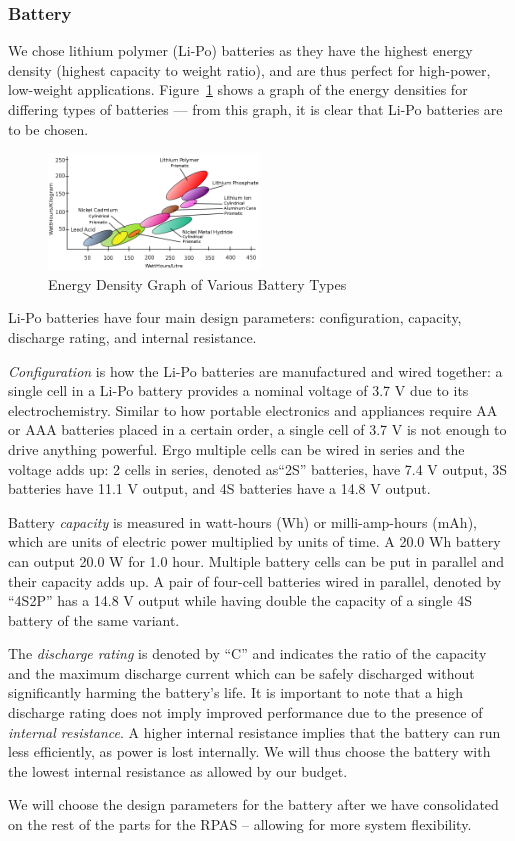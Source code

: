 \subsubsection{Battery}

We chose lithium polymer (Li-Po) batteries as they have the highest energy density (highest capacity to weight ratio), and are thus  perfect for high-power, low-weight applications. Figure~\ref{fig:batterytypes} shows a graph of the energy densities for differing types of batteries \cite{battery} --- from this graph, it is clear that Li-Po batteries are to be chosen.

\begin{figure}[h]
    \centering
    \includegraphics[width=0.5\textwidth]{img/energydensity.png}
    \caption{Energy Density Graph of Various Battery Types}
    \label{fig:batterytypes}
\end{figure}

Li-Po batteries have four main design parameters: configuration, capacity, discharge rating, and internal resistance.

\textit{Configuration} is how the Li-Po batteries are manufactured and wired together: a single cell in a Li-Po battery provides a 
nominal voltage of 3.7 V due to its electrochemistry.
Similar to how portable electronics and appliances require AA or AAA batteries placed in a certain order, a single cell of 3.7 V is not enough to drive anything powerful. Ergo multiple cells can be wired in series and the 
voltage adds up: 2 cells in series, denoted as``2S'' batteries, have 7.4 V output, 3S batteries have 11.1 V output, and 4S batteries have a 14.8 V output. 

Battery \textit{capacity} is measured in watt-hours (Wh) or milli-amp-hours (mAh), which are units of electric power multiplied by units of time. A 20.0 Wh battery can output 20.0 W for 1.0 hour. Multiple battery cells can be put in parallel and their capacity adds up. A pair of four-cell batteries wired in parallel, denoted by ``4S2P'' has a 14.8 V output while having double the capacity of a single 4S battery of the same variant.

The \textit{discharge rating} is denoted by ``C'' and indicates the ratio of the capacity and the maximum discharge current which can be safely discharged without significantly harming the battery's life. It is important to note that a high discharge rating does not imply improved performance due to the presence of \textit{internal resistance}. A higher internal resistance implies that the battery can run less efficiently, as power is lost internally\cite{battery-c}. We will thus choose the battery with the lowest internal resistance as allowed by our budget. 

We will choose the design parameters for the battery after we have consolidated on the rest of the parts for the RPAS -- allowing for more system flexibility. 
